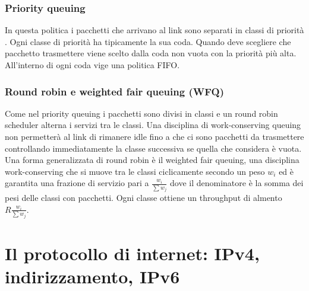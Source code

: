 \subsubsection{Priority queuing}
In questa politica i pacchetti che arrivano al link sono separati in classi di priorit\`a . Ogni classe di priorit\`a ha tipicamente la sua coda. Quando 
deve scegliere che pacchetto trasmettere viene scelto dalla coda non vuota con la priorit\`a pi\`u alta. All'interno di ogni coda vige una politica FIFO.
\subsubsection{Round robin e weighted fair queuing (WFQ)}
Come nel priority queuing i pacchetti sono divisi in classi e un round robin scheduler alterna i servizi tra le classi. Una disciplina di work-conserving 
queuing non permetter\`a al link di rimanere idle fino a che ci sono pacchetti da trasmettere controllando immediatamente la classe successiva se quella
che considera \`e vuota. Una forma generalizzata di round robin \`e il weighted fair queuing, una disciplina work-conserving che si muove tra le classi
ciclicamente secondo un peso $w_i$ ed \`e garantita una frazione di servizio pari a $\frac{w_i}{\sum w_j}$ dove il denominatore \`e la somma dei pesi delle
classi con pacchetti. Ogni classe ottiene un throughput di almento $R\frac{w_i}{\sum w_j}$.
\section{Il protocollo di internet: IPv4, indirizzamento, IPv6}
